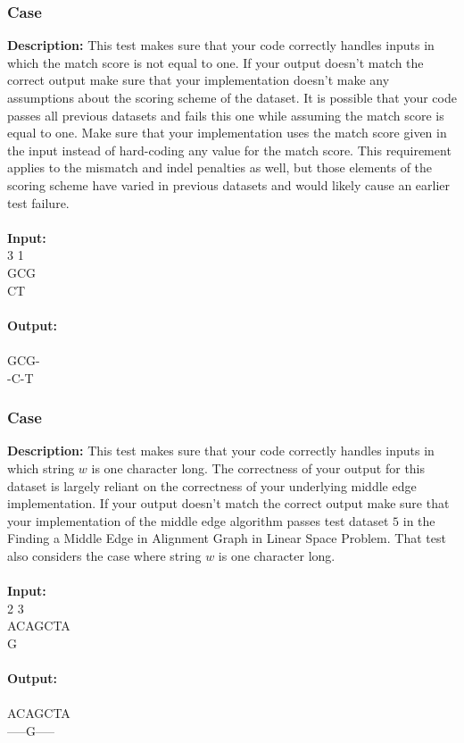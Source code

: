 \documentclass{article}
\newcommand{\code}[1]{{\fontfamily{pcr}\selectfont #1}}
\begin{document}
\subsubsection*{Case }
\hline \vspace{5}
\textbf{Description:} This test makes sure that your code correctly handles inputs in which the match score is not equal to one. If your output doesn’t match the correct output make sure that your implementation doesn’t make any assumptions about the scoring scheme of the dataset. It is possible that your code passes all previous datasets and fails this one while assuming the match score is equal to one. Make sure that your implementation uses the match score given in the input instead of hard-coding any value for the match score. This requirement applies to the mismatch and indel penalties as well, but those elements of the scoring scheme have varied in previous datasets and would likely cause an earlier test failure.\\ \\
\noindent \textbf{Input:}\\
\code{2 3 1\\GCG\\CT}\\ \\
\noindent \textbf{Output:}\\
\code{-1\\GCG-\\-C-T}

\subsubsection*{Case }
\hline \vspace{5}
\textbf{Description:} This test makes sure that your code correctly handles inputs in which string $w$ is one character long. The correctness of your output for this dataset is largely reliant on the correctness of your underlying middle edge implementation. If your output doesn’t match the correct output make sure that your implementation of the middle edge algorithm passes test dataset $5$ in the Finding a Middle Edge in Alignment Graph in Linear Space Problem. That test also considers the case where string $w$ is one character long.\\ \\
\noindent \textbf{Input:}\\
\code{1 2 3\\ACAGCTA\\G}\\ \\
\noindent \textbf{Output:}\\
\code{-17\\ACAGCTA\\-----G-----}
\pagebreak
\end{document}
